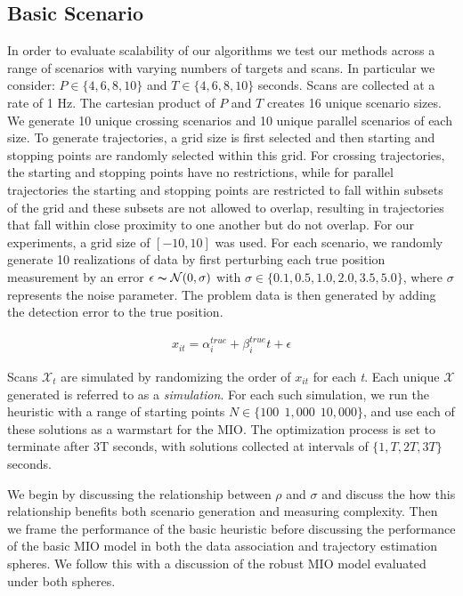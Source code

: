 \documentclass[journal]{IEEEtran}
\begin{document}
\subsection{Basic Scenario}\label{sec:Basic_Results}
In order to evaluate scalability of our algorithms we test our methods across a range of scenarios with varying numbers of targets and scans. In particular we consider: $ P \in \{4,6,8,10\}$ and $T \in \{4,6,8,10\}$ seconds. Scans are collected at a rate of 1 Hz. The cartesian product of $P$ and $T$ creates 16 unique scenario sizes. We generate 10 unique crossing scenarios and 10 unique parallel scenarios of each size. To generate trajectories, a grid size is first selected and then starting and stopping points are randomly selected within this grid. For crossing trajectories, the starting and stopping points have no restrictions, while for parallel trajectories the starting and stopping points are restricted to fall within subsets of the grid and these subsets are not allowed to overlap, resulting in trajectories that fall within close proximity to one another but do not overlap. For our experiments, a grid size of $[-10,10]$ was used. For each scenario, we randomly generate 10 realizations of data by first perturbing each true position measurement by an error $\epsilon \thicksim \mathcal{N}(0,\sigma)$ with $\sigma \in \{0.1,0.5,1.0,2.0,3.5,5.0\}$, where $\sigma$ represents the noise parameter. The problem data is then generated by adding the detection error to the true position.

\begin{align}
	x_{it} = \alpha^{true}_{i} + \beta^{true}_{i}t+\epsilon
\end{align}

Scans $\mathcal{X}_{t}$ are simulated by randomizing the order of $x_{it}$ for each \textit{t}. Each unique $\boldsymbol{\mathcal{X}}$ generated is referred to as a \textit{simulation}. For each such simulation, we run the heuristic with a range of starting points $N \in \{100\ \ 1,000\ \ 10,000\}$, and use each of these solutions as a warmstart for the MIO. The optimization process is set to terminate after 3T seconds, with solutions collected at intervals of $\{1,T,2T,3T\}$ seconds.

We begin by discussing the relationship between $\rho$ and $\sigma$ and discuss the how this relationship benefits both scenario generation and measuring complexity. Then we frame the performance of the basic heuristic before discussing the performance of the basic MIO model in both the data association and trajectory estimation spheres. We follow this with a discussion of the robust MIO model evaluated under both spheres.
\end{document}
